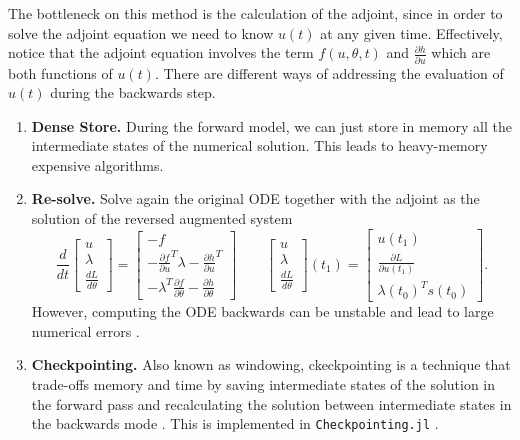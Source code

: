 The bottleneck on this method is the calculation of the adjoint, since in order to solve the adjoint equation we need to know $u(t)$ at any given time. 
Effectively, notice that the adjoint equation involves the term $f(u, \theta, t)$ and $\frac{\partial h}{\partial u}$ which are both functions of $u(t)$. 
There are different ways of addressing the evaluation of $u(t)$ during the backwards step.
\begin{enumerate}[label=(\roman*)]
    \item \textbf{Dense Store.} During the forward model, we can just store in memory all the intermediate states of the numerical solution. 
    This leads to heavy-memory expensive algorithms. 
    \item \textbf{Re-solve.} Solve again the original ODE together with the adjoint as the solution of the reversed augmented system \cite{chen_neural_2019}
    \begin{equation}
    \frac{d}{dt}
    \begin{bmatrix}
       u \\
       \lambda \\
       \frac{dL}{d\theta}
    \end{bmatrix}
    = 
    \begin{bmatrix}
       -f \\
       - \frac{\partial f}{\partial u}^T \lambda - \frac{\partial h}{\partial u}^T \\
       - \lambda^T \frac{\partial f}{\partial \theta} - \frac{\partial h}{\partial \theta}
    \end{bmatrix}
    \qquad 
    \begin{bmatrix}
       u \\
       \lambda \\
       \frac{dL}{d\theta}
    \end{bmatrix}(t_1)
    = 
    \begin{bmatrix}
       u(t_1) \\
       \frac{\partial L}{\partial u(t_1)} \\
       \lambda(t_0)^T s(t_0)
    \end{bmatrix}.
    \end{equation}
    However, computing the ODE backwards can be unstable and lead to large numerical errors \cite{kim_stiff_2021, Zhuang_2020}. 
    \item \textbf{Checkpointing. } Also known as windowing, ckeckpointing is a technique that trade-offs memory and time by saving intermediate states of the solution in the forward pass and recalculating the solution between intermediate states in the backwards mode \cite{Checkpoiting_2023, griewank2008evaluatingderivatives}. 
    This is implemented in \texttt{Checkpointing.jl} \cite{Checkpoiting_2023}.
\end{enumerate} 

